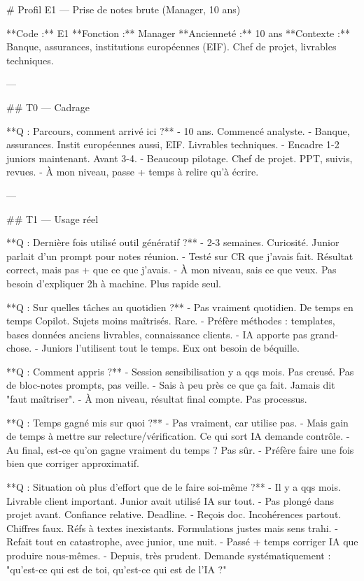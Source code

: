 # Profil E1 — Prise de notes brute (Manager, 10 ans)

**Code :** E1  
**Fonction :** Manager  
**Ancienneté :** 10 ans  
**Contexte :** Banque, assurances, institutions européennes (EIF). Chef de projet, livrables techniques.

---

## T0 — Cadrage

**Q : Parcours, comment arrivé ici ?**
- 10 ans. Commencé analyste.
- Banque, assurances. Instit européennes aussi, EIF. Livrables techniques.
- Encadre 1-2 juniors maintenant. Avant 3-4.
- Beaucoup pilotage. Chef de projet. PPT, suivis, revues.
- À mon niveau, passe + temps à relire qu'à écrire.

---

## T1 — Usage réel

**Q : Dernière fois utilisé outil génératif ?**
- 2-3 semaines. Curiosité. Junior parlait d'un prompt pour notes réunion.
- Testé sur CR que j'avais fait. Résultat correct, mais pas + que ce que j'avais.
- À mon niveau, sais ce que veux. Pas besoin d'expliquer 2h à machine. Plus rapide seul.

**Q : Sur quelles tâches au quotidien ?**
- Pas vraiment quotidien. De temps en temps Copilot. Sujets moins maîtrisés. Rare.
- Préfère méthodes : templates, bases données anciens livrables, connaissance clients.
- IA apporte pas grand-chose.
- Juniors l'utilisent tout le temps. Eux ont besoin de béquille.

**Q : Comment appris ?**
- Session sensibilisation y a qqs mois. Pas creusé. Pas de bloc-notes prompts, pas veille.
- Sais à peu près ce que ça fait. Jamais dit "faut maîtriser".
- À mon niveau, résultat final compte. Pas processus.

**Q : Temps gagné mis sur quoi ?**
- Pas vraiment, car utilise pas.
- Mais gain de temps à mettre sur relecture/vérification. Ce qui sort IA demande contrôle.
- Au final, est-ce qu'on gagne vraiment du temps ? Pas sûr.
- Préfère faire une fois bien que corriger approximatif.

**Q : Situation où plus d'effort que de le faire soi-même ?**
- Il y a qqs mois. Livrable client important. Junior avait utilisé IA sur tout.
- Pas plongé dans projet avant. Confiance relative. Deadline.
- Reçois doc. Incohérences partout. Chiffres faux. Réfs à textes inexistants. Formulations justes mais sens trahi.
- Refait tout en catastrophe, avec junior, une nuit.
- Passé + temps corriger IA que produire nous-mêmes.
- Depuis, très prudent. Demande systématiquement : "qu'est-ce qui est de toi, qu'est-ce qui est de l'IA ?"

